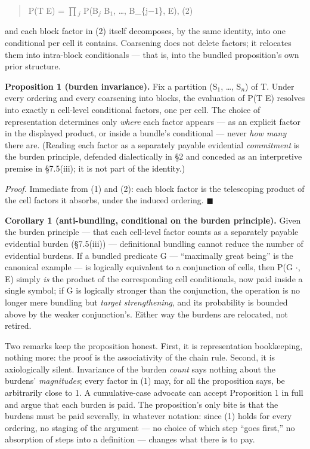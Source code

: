 \begin{quote}
P(T \textbar{} E) = $\prod$$_j$ P(B$_j$ \textbar{} B$_1$, \ldots, B\_\{j$-$1\}, E), (2)
\end{quote}

and each block factor in (2) itself decomposes, by the same identity, into one conditional per cell it contains. Coarsening does not delete factors; it relocates them into intra-block conditionals --- that is, into the bundled proposition's own prior structure.

\textbf{Proposition 1 (burden invariance).} Fix a partition (S$_1$, \ldots, S$_n$) of T. Under every ordering and every coarsening into blocks, the evaluation of P(T \textbar{} E) resolves into exactly n cell-level conditional factors, one per cell. The choice of representation determines only \emph{where} each factor appears --- as an explicit factor in the displayed product, or inside a bundle's conditional --- never \emph{how many} there are. (Reading each factor as a separately payable evidential \emph{commitment} is the burden principle, defended dialectically in \S{}2 and conceded as an interpretive premise in \S{}7.5(iii); it is not part of the identity.)

\emph{Proof.} Immediate from (1) and (2): each block factor is the telescoping product of the cell factors it absorbs, under the induced ordering. $\blacksquare$

\textbf{Corollary 1 (anti-bundling, conditional on the burden principle).} Given the burden principle --- that each cell-level factor counts as a separately payable evidential burden (\S{}7.5(iii)) --- definitional bundling cannot reduce the number of evidential burdens. If a bundled predicate G --- ``maximally great being'' is the canonical example --- is logically equivalent to a conjunction of cells, then P(G \textbar{} $\cdot$, E) simply \emph{is} the product of the corresponding cell conditionals, now paid inside a single symbol; if G is logically stronger than the conjunction, the operation is no longer mere bundling but \emph{target strengthening}, and its probability is bounded above by the weaker conjunction's. Either way the burdens are relocated, not retired.

Two remarks keep the proposition honest. First, it is representation bookkeeping, nothing more: the proof is the associativity of the chain rule. Second, it is axiologically silent. Invariance of the burden \emph{count} says nothing about the burdens' \emph{magnitudes}; every factor in (1) may, for all the proposition says, be arbitrarily close to 1. A cumulative-case advocate can accept Proposition 1 in full and argue that each burden is paid. The proposition's only bite is that the burdens must be paid severally, in whatever notation: since (1) holds for every ordering, no staging of the argument --- no choice of which step ``goes first,'' no absorption of steps into a definition --- changes what there is to pay.

